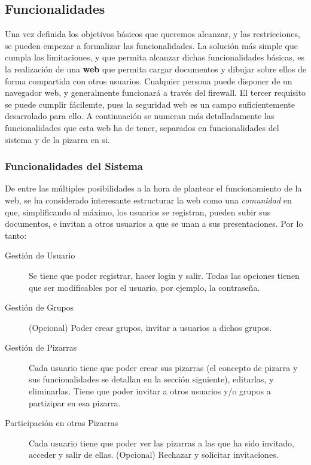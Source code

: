 \subsection{Funcionalidades}
Una vez definida los objetivos básicos que queremos alcanzar, y las restricciones, se pueden empezar a formalizar las funcionalidades. La solución más simple que cumpla las limitaciones, y que permita alcanzar dichas funcionalidades básicas, es la realización de una \textbf{web} que permita cargar documentos y dibujar sobre ellos de forma compartida con otros usuarios. Cualquier persona puede disponer de un navegador web, y generalmente funcionará a través del firewall. El tercer requisito se puede cumplir fácilemte, pues la seguridad web es un campo suficientemente desarrolado para ello. A continuación se numeran más detalladamente las funcionalidades que esta web ha de tener, separados en funcionalidades del sistema y de la pizarra en si.

\subsubsection{Funcionalidades del Sistema}
De entre las múltiples posibilidades a la hora de plantear el funcionamiento de la web, se ha considerado interesante estructurar la web como una \emph{comunidad} en que, simplificando al máximo, los usuarios se registran, pueden subir sus documentos, e invitan a otros usuarios a que se unan a sus presentaciones. Por lo tanto:

\begin{description}
	\item[Gestión de Usuario] Se tiene que poder registrar, hacer login y salir. Todas las opciones tienen que ser modificables por el usuario, por ejemplo, la contraseña.
	\item[Gestión de Grupos] (Opcional) Poder crear grupos, invitar a usuarios a dichos grupos.
	\item[Gestión de Pizarras] Cada usuario tiene que poder crear sus pizarras (el concepto de pizarra y sus funcionalidades se detallan en la sección siguiente), editarlas, y eliminarlas. Tiene que poder invitar a otros usuarios y/o grupos a partizipar en esa pizarra.
	\item[Participación en otras Pizarras] Cada usuario tiene que poder ver las pizarras a las que ha sido invitado, acceder y salir de ellas. (Opcional) Rechazar y solicitar invitaciones.
\end{description}

